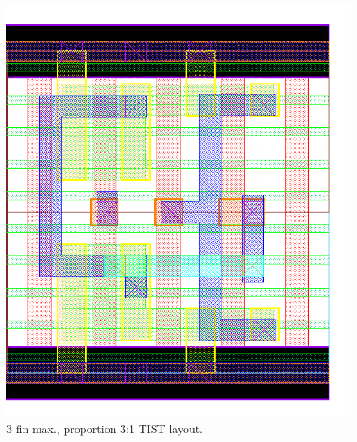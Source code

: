 \documentclass[pgmicro,mestrado,english]{iiufrgs}
\begin{document}
\begin{figure}[]
\centering
\includegraphics[width=\textwidth,height=\textheight,keepaspectratio]{TIST3F1F.png}
\caption{3 fin max., proportion 3:1 TIST layout.}
\label{fig:TIST2F}
\end{figure}
\end{document}
